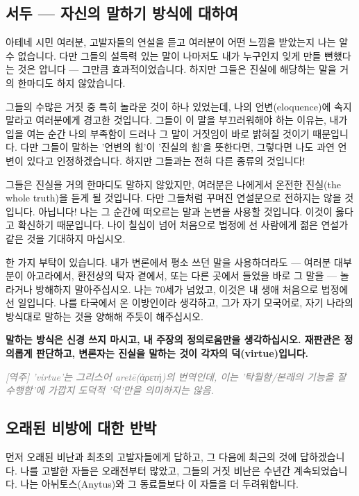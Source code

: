 \documentclass[11pt, a4paper]{article}
\newcommand{\tnote}[1]{\par\noindent\textit{\textcolor{gray}{[역주] #1}}\par\smallskip}
\begin{document}
\subsection{서두 — 자신의 말하기 방식에 대하여}


아테네 시민 여러분, 고발자들의 연설을 듣고 여러분이 어떤 느낌을 받았는지 나는 알 수 없습니다. 다만 그들의 설득력 있는 말이 나마저도 내가 누구인지 잊게 만들 뻔했다는 것은 압니다 — 그만큼 효과적이었습니다. 하지만 그들은 진실에 해당하는 말을 거의 한마디도 하지 않았습니다.


그들의 수많은 거짓 중 특히 놀라운 것이 하나 있었는데, 나의 언변(eloquence)에 속지 말라고 여러분에게 경고한 것입니다. 그들이 이 말을 부끄러워해야 하는 이유는, 내가 입을 여는 순간 나의 부족함이 드러나 그 말이 거짓임이 바로 밝혀질 것이기 때문입니다. 다만 그들이 말하는 '언변의 힘'이 '진실의 힘'을 뜻한다면, 그렇다면 나도 과연 언변이 있다고 인정하겠습니다. 하지만 그들과는 전혀 다른 종류의 것입니다!


그들은 진실을 거의 한마디도 말하지 않았지만, 여러분은 나에게서 온전한 진실(the whole truth)을 듣게 될 것입니다. 다만 그들처럼 꾸며진 연설문으로 전하지는 않을 것입니다. 아닙니다! 나는 그 순간에 떠오르는 말과 논변을 사용할 것입니다. 이것이 옳다고 확신하기 때문입니다. 나이 칠십이 넘어 처음으로 법정에 선 사람에게 젊은 연설가 같은 것을 기대하지 마십시오.


한 가지 부탁이 있습니다. 내가 변론에서 평소 쓰던 말을 사용하더라도 — 여러분 대부분이 아고라에서, 환전상의 탁자 곁에서, 또는 다른 곳에서 들었을 바로 그 말을 — 놀라거나 방해하지 말아주십시오. 나는 70세가 넘었고, 이것은 내 생애 처음으로 법정에 선 일입니다. 나를 타국에서 온 이방인이라 생각하고, 그가 자기 모국어로, 자기 나라의 방식대로 말하는 것을 양해해 주듯이 해주십시오.


\textbf{말하는 방식은 신경 쓰지 마시고, 내 주장의 정의로움만을 생각하십시오. 재판관은 정의롭게 판단하고, 변론자는 진실을 말하는 것이 각자의 덕(virtue)입니다.}


\tnote{'virtue'는 그리스어 aretē(ἀρετή)의 번역인데, 이는 '탁월함/본래의 기능을 잘 수행함'에 가깝지 도덕적 '덕'만을 의미하지는 않음.}


\bigskip


\subsection{오래된 비방에 대한 반박}


먼저 오래된 비난과 최초의 고발자들에게 답하고, 그 다음에 최근의 것에 답하겠습니다. 나를 고발한 자들은 오래전부터 많았고, 그들의 거짓 비난은 수년간 계속되었습니다. 나는 아뉘토스(Anytus)와 그 동료들보다 이 자들을 더 두려워합니다.
\end{document}
